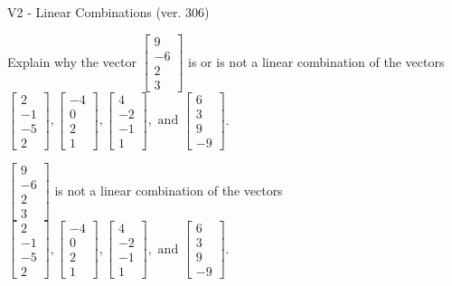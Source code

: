 \begin{exercise}
  \begin{exerciseTitle}V2 - Linear Combinations (ver. 306)\end{exerciseTitle}
  \begin{exerciseStatement}
    Explain why the vector \(\left[\begin{array}{c}
9 \\
-6 \\
2 \\
3
\end{array}\right]\)  is or is not a linear 
	combination of the vectors \(\left[\begin{array}{c}
2 \\
-1 \\
-5 \\
2
\end{array}\right] , \left[\begin{array}{c}
-4 \\
0 \\
2 \\
1
\end{array}\right] , \left[\begin{array}{c}
4 \\
-2 \\
-1 \\
1
\end{array}\right] , \text{ and } \left[\begin{array}{c}
6 \\
3 \\
9 \\
-9
\end{array}\right]\).
	


  \end{exerciseStatement}
  \begin{exerciseAnswer}
   \(\left[\begin{array}{c}
9 \\
-6 \\
2 \\
3
\end{array}\right]\) 
  	 is not  
	a linear combination of the vectors \(\left[\begin{array}{c}
2 \\
-1 \\
-5 \\
2
\end{array}\right] , \left[\begin{array}{c}
-4 \\
0 \\
2 \\
1
\end{array}\right] , \left[\begin{array}{c}
4 \\
-2 \\
-1 \\
1
\end{array}\right] , \text{ and } \left[\begin{array}{c}
6 \\
3 \\
9 \\
-9
\end{array}\right]\).


\end{exerciseAnswer}
\end{exercise}

